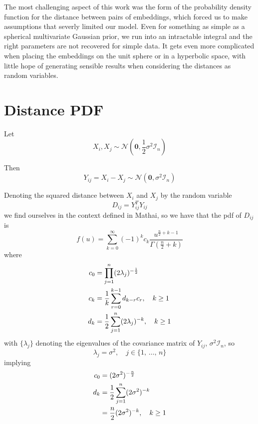 \documentclass[12pt]{report}
\newcommand{\bs}{\boldsymbol}
\newcommand{\mc}[1]{\mathcal{#1}}
\newcommand{\half}{\frac{1}{2}}
\newcommand{\sumlim}[3]{\sum\limits_{#1 = #2}^{#3}}
\newcommand{\prodlim}[3]{\prod\limits_{#1 = #2}^{#3}}
\renewcommand{\bs}{\boldsymbol}
\begin{document}
The most challenging aspect of this work was the form of the probability density function for the distance between pairs of embeddings, which forced us to make assumptions that severly limited our model. Even for something as simple as a spherical multivariate Gaussian prior, we run into an intractable integral and the right parameters are not recovered for simple data. It gets even more complicated when placing the embeddings on the unit sphere or in a hyperbolic space, with little hope of generating sensible results when considering the distances as random variables. \\

\appendix
\printbibliography


\chapter{Distance PDF}\label{appendix}
\raggedright

Let
\begin{equation*}
    X_i, X_j \sim \mathcal{N}(\bs{0}, \half\sigma^2\mc{I}_n)
\end{equation*}

Then
\begin{equation*}
    Y_{ij} = X_i - X_j \sim \mathcal{N}(\bs{0}, \sigma^2\mc{I}_n)
\end{equation*}

Denoting the squared distance between $X_i$ and $X_j$ by the random variable
\begin{equation*}
    D_{ij} = Y_{ij}^TY_{ij}
\end{equation*}
we find ourselves in the context defined in Mathai, so we have that the pdf of $D_{ij}$ is
\begin{equation*}
    f(u) = \sumlim{k}{0}{\infty}(-1)^kc_k\frac{u^{\frac{n}{2}+k-1}}{\Gamma(\frac{n}{2}+k)}
\end{equation*}
where
\begin{align}
    c_0 &= \prodlim{j}{1}{n}(2\lambda_j)^{-\half} \notag\\
    c_k &= \frac{1}{k}\sumlim{r}{0}{k-1}d_{k-r}c_r,\quad k\geq1 \\
    d_k &= \half\sumlim{j}{1}{n}(2\lambda_j)^{-k},\quad k\geq1 \notag
\end{align}
with $\{\lambda_j\}$ denoting the eigenvalues of the covariance matrix of $Y_{ij}$, $\sigma^2\mathcal{I}_n$, so
\begin{equation*}
    \lambda_j = \sigma^2,\quad j\in\{1,\,\dots,\,n\}
\end{equation*}
implying
\begin{align}
    c_0 &= (2\sigma^2)^{-\frac{n}{2}} \\
    d_k &= \half\sumlim{j}{1}{n}(2\sigma^2)^{-k} \notag\\
        &= \frac{n}{2}(2\sigma^2)^{-k},\quad k\geq1
\end{align}
\end{document}
